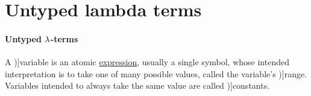 \section{Untyped lambda terms}\label{sec:untyped_lambda_terms}

\paragraph{Untyped \( {\mathrm \lambda} \)-terms}

\begin{concept}\label{con:variable}
  A \term[en=variable (\cite[9]{Church1956LogicVol1})]{variable} is an atomic \hyperref[con:expression]{expression}, usually a single symbol, whose intended interpretation is to take one of many possible values, called the variable's \term[en=range (\cite[9]{Church1956LogicVol1})]{range}. Variables intended to always take the same value are called \term[en=constant (\cite[9]{Church1956LogicVol1})]{constants}.
\end{concept}
